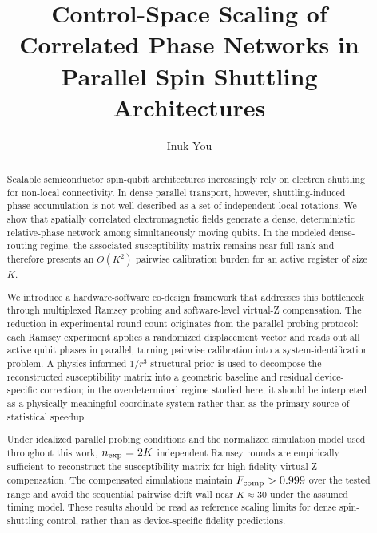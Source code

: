 \documentclass[a4paper,twocolumn,11pt]{quantumarticle}
\begin{document}
\title{Control-Space Scaling of Correlated Phase Networks in Parallel Spin Shuttling Architectures}

\author{Inuk You}

\begin{abstract}
Scalable semiconductor spin-qubit architectures increasingly rely on electron shuttling for non-local connectivity. In dense parallel transport, however, shuttling-induced phase accumulation is not well described as a set of independent local rotations. We show that spatially correlated electromagnetic fields generate a dense, deterministic relative-phase network among simultaneously moving qubits. In the modeled dense-routing regime, the associated susceptibility matrix remains near full rank and therefore presents an $O(K^2)$ pairwise calibration burden for an active register of size $K$.

We introduce a hardware-software co-design framework that addresses this bottleneck through multiplexed Ramsey probing and software-level virtual-Z compensation. The reduction in experimental round count originates from the parallel probing protocol: each Ramsey experiment applies a randomized displacement vector and reads out all active qubit phases in parallel, turning pairwise calibration into a system-identification problem. A physics-informed $1/r^3$ structural prior is used to decompose the reconstructed susceptibility matrix into a geometric baseline and residual device-specific correction; in the overdetermined regime studied here, it should be interpreted as a physically meaningful coordinate system rather than as the primary source of statistical speedup.

Under idealized parallel probing conditions and the normalized simulation model used throughout this work, $n_{\rm exp}=2K$ independent Ramsey rounds are empirically sufficient to reconstruct the susceptibility matrix for high-fidelity virtual-Z compensation. The compensated simulations maintain $F_{\rm comp}>0.999$ over the tested range and avoid the sequential pairwise drift wall near $K\approx30$ under the assumed timing model. These results should be read as reference scaling limits for dense spin-shuttling control, rather than as device-specific fidelity predictions.
\end{abstract}

\maketitle
\end{document}
